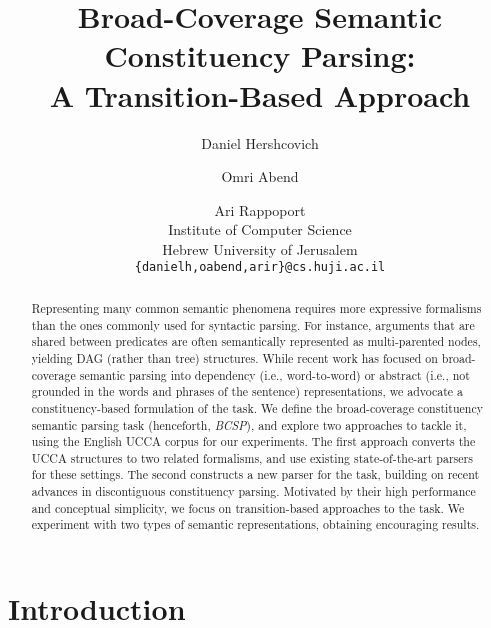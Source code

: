 \documentclass[11pt]{article}
\title{Broad-Coverage Semantic Constituency Parsing: \\
A Transition-Based Approach}
\author{Daniel Hershcovich \and Omri Abend \and Ari Rappoport \\
  Institute of Computer Science \\
  Hebrew University of Jerusalem \\
  {\tt \{danielh,oabend,arir\}@cs.huji.ac.il}
}
\date{}
\begin{document}
\maketitle

\begin{abstract}

  Representing many common semantic phenomena requires more expressive formalisms
  than the ones commonly used for syntactic parsing. For instance, arguments that are shared
  between predicates are often semantically represented as multi-parented nodes,
  yielding DAG (rather than tree) structures.
  While recent work has focused on broad-coverage semantic parsing into dependency
  (i.e., word-to-word) or abstract (i.e., not grounded in the words and phrases of the
  sentence) representations, we advocate a constituency-based formulation of the task.
  We define the broad-coverage constituency semantic parsing task (henceforth, {\it BCSP}), and explore
  two approaches to tackle it, using the English UCCA corpus for our experiments.
  The first approach converts the UCCA structures to two related formalisms, and use existing
  state-of-the-art parsers for these settings. The second constructs a new parser for the task,
  building on recent advances in discontiguous constituency parsing. Motivated by their high
  performance and conceptual simplicity, we focus on transition-based approaches to the task.
  We experiment with two types of semantic representations, obtaining encouraging results.
  
  
\end{abstract}



\section{Introduction}
\end{document}

